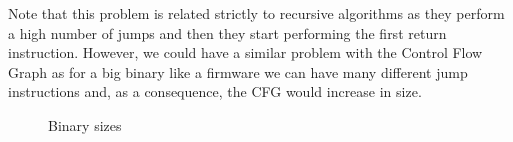 Note that this problem is related strictly to recursive algorithms as they perform
a high number of jumps and then they start performing the first return instruction.
However, we could have a similar problem with the Control Flow Graph as for a big
binary like a firmware we can have many different jump instructions and, as a
consequence, the CFG would increase in size.

\begin{figure}[htbp]
  \centering
  \def\stackalignment{r} %
  {\scriptsize }
  \caption{Binary sizes}
  \label{fig:binsize}
\end{figure}

